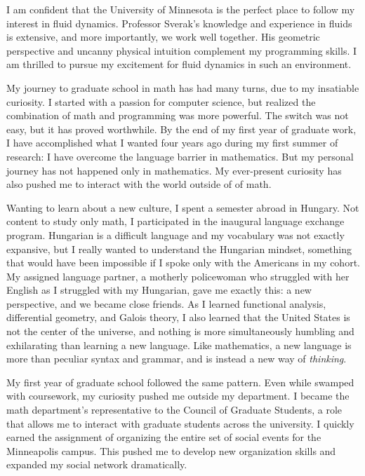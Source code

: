 \documentclass[12pt]{article}
\begin{document}
I am confident that the University of Minnesota is the perfect place to follow my interest in fluid dynamics. Professor Sverak's knowledge and experience in fluids is extensive, and more importantly,  we work well together. His geometric perspective and uncanny physical intuition complement my programming skills. I am thrilled to pursue my excitement for fluid dynamics in such an environment.

My journey to graduate school in math has had many turns, due to my insatiable curiosity. I started with a passion for computer science, but realized the combination of math and programming was more powerful. The switch was not easy, but it has proved worthwhile. By the end of my first year of graduate work, I have accomplished what I wanted four years ago during my first summer of research: I have overcome the language barrier in mathematics. But my personal journey has not happened only in mathematics. My ever-present curiosity has also pushed me to interact with the world outside of of math.

Wanting to learn about a new culture, I spent a semester abroad in Hungary. Not content to study only math, I participated in the inaugural language exchange program. Hungarian is a difficult language and my vocabulary was not exactly expansive, but I really wanted to understand the Hungarian mindset, something that would have been impossible if I spoke only with the Americans in my cohort. My assigned language partner, a motherly policewoman who struggled with her English as I struggled with my Hungarian, gave me exactly this: a new perspective, and we became close friends. As I learned functional analysis, differential geometry, and Galois theory, I also learned that the United States is not the center of the universe, and nothing is more simultaneously humbling and exhilarating than learning a new language. Like mathematics, a new language is more than peculiar syntax and grammar, and is instead a new way of \textit{thinking}.  

My first year of graduate school followed the same pattern. Even while swamped with coursework, my curiosity pushed me outside my department. I became the math department's representative to the Council of Graduate Students, a role that allows me to interact with graduate students across the university. I quickly earned the assignment of organizing the entire set  of social events for the Minneapolis campus. This pushed me to develop new organization skills and expanded my social network dramatically. 
\end{document}
